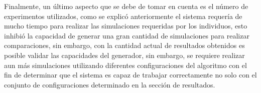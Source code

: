 Finalmente, un último aspecto que se debe de tomar en cuenta es el número de
experimentos utilizados, como se explicó anteriormente el sistema requería de
mucho tiempo para realizar las simulaciones requeridas por los individuos, esto
inhibió la capacidad de generar una gran cantidad de simulaciones para realizar
comparaciones, sin embargo, con la cantidad actual de resultados obtenidos es
posible validar las capacidades del generador, sin embargo, se requiere realizar
aun más simulaciones utilizando diferentes configuraciones del algoritmo con el
fin de determinar que el sistema es capaz de trabajar correctamente no solo con
el conjunto de configuraciones determinado en la sección de resultados. 
